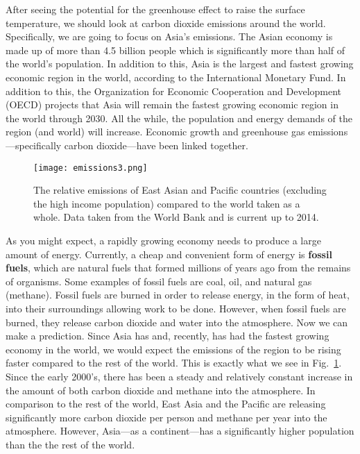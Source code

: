 After seeing the potential for the greenhouse effect to raise the surface temperature, we should look at carbon dioxide emissions around the world. Specifically, we are going to focus on Asia's emissions. The Asian economy is made up of more than 4.5 billion people which is significantly more than half of the world's population. In addition to this, Asia is the largest and fastest growing economic region in the world, according to the International Monetary Fund. In addition to this, the Organization for Economic Cooperation and Development (OECD) projects that Asia will remain the fastest growing economic region in the world through 2030. All the while, the population and energy demands of the region (and world) will increase. Economic growth and greenhouse gas emissions---specifically carbon dioxide---have been linked together.\cite{saidi2015impact} 

\begin{figure}[ht!]
    \centering
    \texttt{[image: emissions3.png]}
    \caption{The relative emissions of East Asian and Pacific countries (excluding the high income population) compared to the world taken as a whole. Data taken from the World Bank and is current up to 2014.\cite{WBco2,WBmethane}} 
    \label{fig:asia_emissions}
\end{figure}

As you might expect, a rapidly growing economy needs to produce a large amount of energy. Currently, a cheap and convenient form of energy is \textbf{fossil fuels}, which are natural fuels that formed millions of years ago from the remains of organisms. Some examples of fossil fuels are coal, oil, and natural gas (methane). Fossil fuels are burned in order to release energy, in the form of heat, into their surroundings allowing work to be done. However, when fossil fuels are burned, they release carbon dioxide and water into the atmosphere. Now we can make a prediction. Since Asia has and, recently, has had the fastest growing economy in the world, we would expect the emissions of the region to be rising faster compared to the rest of the world. This is exactly what we see in Fig.~\ref{fig:asia_emissions}. Since the early 2000's, there has been a steady and relatively constant increase in the amount of both carbon dioxide and methane into the atmosphere. In comparison to the rest of the world, East Asia and the Pacific are releasing significantly more carbon dioxide per person and methane per year into the atmosphere. However, Asia---as a continent---has a significantly higher population than the the rest of the world.

